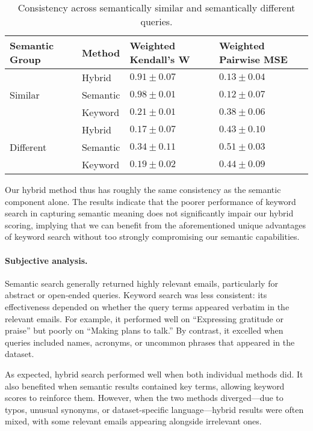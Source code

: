 \documentclass{article}
\begin{document}
\begin{table}[ht]
  \caption{Consistency across semantically similar and semantically different queries.}
  \label{tab:results}
  \centering
  \begin{tabular}{llll}
    \toprule
    \textbf{Semantic Group} & \textbf{Method} & \textbf{Weighted Kendall's W} & \textbf{Weighted Pairwise MSE} \\
    \midrule
    \multirow{3}{*}{Similar}
      & Hybrid   & \(0.91 \pm 0.07\) & \(0.13 \pm 0.04\) \\
      & Semantic & \(0.98 \pm 0.01\) & \(0.12 \pm 0.07\) \\
      & Keyword  & \(0.21 \pm 0.01\) & \(0.38 \pm 0.06\) \\
    \midrule
    \multirow{3}{*}{Different}
      & Hybrid   & \(0.17 \pm 0.07\) & \(0.43 \pm 0.10\) \\
      & Semantic & \(0.34 \pm 0.11\) & \(0.51 \pm 0.03\) \\
      & Keyword  & \(0.19 \pm 0.02\) & \(0.44 \pm 0.09\) \\
    \bottomrule
  \end{tabular}
\end{table}

Our hybrid method thus has roughly the same consistency as the semantic component alone. The results indicate that the poorer performance of keyword search in capturing semantic meaning does not significantly impair our hybrid scoring, implying that we can benefit from the aforementioned unique advantages of keyword search without too strongly compromising our semantic capabilities. 

\paragraph{Subjective analysis.} 

Semantic search generally returned highly relevant emails, particularly for abstract or open-ended queries. Keyword search was less consistent: its effectiveness depended on whether the query terms appeared verbatim in the relevant emails. For example, it performed well on “Expressing gratitude or praise” but poorly on “Making plans to talk.” By contrast, it excelled when queries included names, acronyms, or uncommon phrases that appeared in the dataset.

As expected, hybrid search performed well when both individual methods did. It also benefited when semantic results contained key terms, allowing keyword scores to reinforce them. However, when the two methods diverged—due to typos, unusual synonyms, or dataset-specific language—hybrid results were often mixed, with some relevant emails appearing alongside irrelevant ones.
\end{document}
